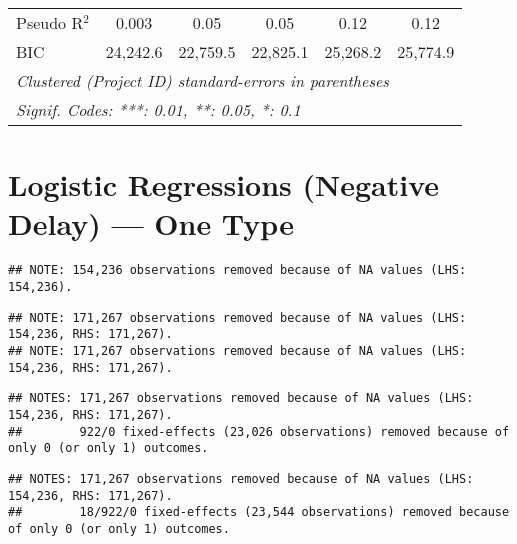\documentclass[
]{article}
\begin{document}
\begin{table}[htbp]
\begin{tabular}{lccccc}
      Pseudo R$^2$                 & 0.003         & 0.05          & 0.05          & 0.12          & 0.12\\  
      BIC                          & 24,242.6      & 22,759.5      & 22,825.1      & 25,268.2      & 25,774.9\\  
      \midrule \midrule
      \multicolumn{6}{l}{\emph{Clustered (Project ID) standard-errors in parentheses}}\\
      \multicolumn{6}{l}{\emph{Signif. Codes: ***: 0.01, **: 0.05, *: 0.1}}\\
   \end{tabular}
\end{table}

\hypertarget{logistic-regressions-negative-delay-one-type}{%
\section{Logistic Regressions (Negative Delay) --- One
Type}\label{logistic-regressions-negative-delay-one-type}}

\begin{verbatim}
## NOTE: 154,236 observations removed because of NA values (LHS: 154,236).
\end{verbatim}

\begin{verbatim}
## NOTE: 171,267 observations removed because of NA values (LHS: 154,236, RHS: 171,267).
## NOTE: 171,267 observations removed because of NA values (LHS: 154,236, RHS: 171,267).
\end{verbatim}

\begin{verbatim}
## NOTES: 171,267 observations removed because of NA values (LHS: 154,236, RHS: 171,267).
##        922/0 fixed-effects (23,026 observations) removed because of only 0 (or only 1) outcomes.
\end{verbatim}

\begin{verbatim}
## NOTES: 171,267 observations removed because of NA values (LHS: 154,236, RHS: 171,267).
##        18/922/0 fixed-effects (23,544 observations) removed because of only 0 (or only 1) outcomes.
\end{verbatim}
\end{document}
